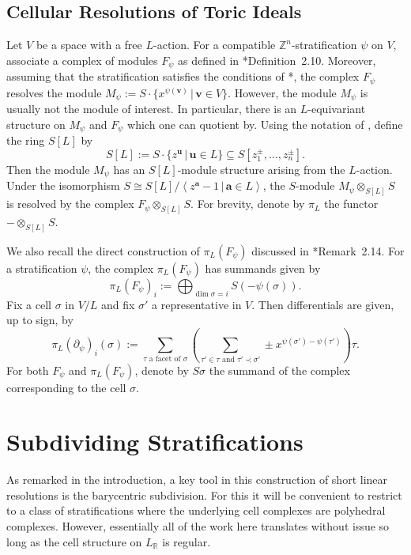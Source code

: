 \documentclass{amsart}
\newcommand{\ZZ}{\mathbb{Z}}
\newcommand{\RR}{\mathbb{R}}
\theoremstyle{remark}
\begin{document}
\subsection*{Cellular Resolutions of Toric Ideals}

Let $V$ be a space with a free $L$-action. For a compatible $\ZZ^n$-stratification $\psi$ on $V$, associate a complex of modules $F_{\psi}$ as defined in \cite{stratification-paper}*{Definition~2.10}. Moreover, assuming that the stratification satisfies the conditions of \cite{stratification-paper}*{}, the complex $F_\psi$ resolves the module $M_\psi:=S\cdot \{x^{\psi(\bm{v})} \,|\, \bm{v} \in V\}$. However, the module $M_\psi$ is usually not the module of interest. In particular, there is an $L$-equivariant structure on $M_\psi$ and $F_\psi$ which one can quotient by. Using the notation of \cite{stratification-paper}, define the ring $S[L]$ by
\[S[L] := S\cdot \{z^{\bm{u}} \,|\, \bm{u}\in L\} \subseteq S[z_1^{\pm},\ldots,z_n^{\pm}].\]
Then the module $M_\psi$ has an $S[L]$-module structure arising from the $L$-action. Under the isomorphism $S\cong S[L]/\left<z^{\bm{a}}-1 \,|\, \bm{a}\in L\right>$, the $S$-module $M_\psi\otimes_{S[L]}S$ is resolved by the complex $F_\psi \otimes_{S[L]} S$. For brevity, denote by $\pi_L$ the functor $-\otimes_{S[L]} S$.

We also recall the direct construction of $\pi_L(F_\psi)$ discussed in \cite{stratification-paper}*{Remark~2.14}. For a stratification $\psi$, the complex $\pi_L(F_\psi)$ has summands given by
\[\pi_L(F_{\psi})_{i} := \bigoplus_{\dim \sigma = i}S(-\psi(\sigma)).\]
Fix a cell $\sigma$ in $V/L$ and fix $\sigma'$ a representative in $V$. Then differentials are given, up to sign, by
\[\pi_L(\partial_{\psi})_{i}(\sigma) := \sum_{\tau\text{ a facet of } \sigma}\left(\sum_{\tau'\in \tau\text{ and }\tau'\prec \sigma'} \pm x^{\psi(\sigma')-\psi(\tau')}\right)\tau.\]
For both $F_\psi$ and $\pi_L(F_\psi)$, denote by $S\sigma$ the summand of the complex corresponding to the cell $\sigma$.


\section{Subdividing Stratifications}
\label{sec:subdivision}

As remarked in the introduction, a key tool in this construction of short linear resolutions is the barycentric subdivision.
For this it will be convenient to restrict to a class of stratifications where the underlying cell complexes are polyhedral complexes. However, essentially all of the work here translates without issue so long as the cell structure on $L_{\RR}$ is regular.
\end{document}
